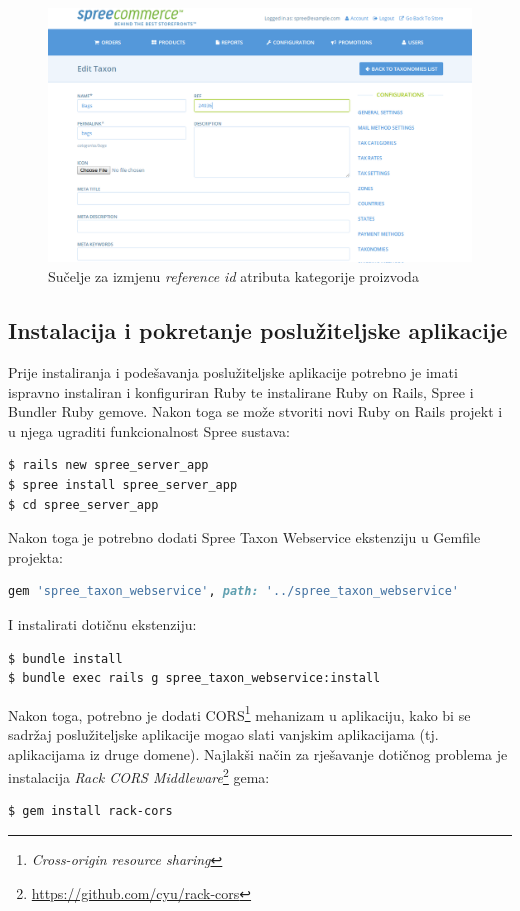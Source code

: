 \begin{figure}[H]
    \centering
    \includegraphics[scale=0.36]{pictures/spree_taxon_webservice}
    \caption{Sučelje za izmjenu \textit{reference id} atributa kategorije proizvoda}
\end{figure}

\subsection{Instalacija i pokretanje poslužiteljske aplikacije}

Prije instaliranja i podešavanja poslužiteljske aplikacije potrebno je imati ispravno instaliran i konfiguriran Ruby te instalirane Ruby on Rails, Spree i Bundler Ruby gemove. 
Nakon toga se može stvoriti novi Ruby on Rails projekt i u njega ugraditi funkcionalnost Spree sustava:
\begin{lstlisting}[language=bash]
$ rails new spree_server_app
$ spree install spree_server_app
$ cd spree_server_app
\end{lstlisting}

Nakon toga je potrebno dodati Spree Taxon Webservice ekstenziju u Gemfile projekta:
\begin{lstlisting}[language=ruby]
gem 'spree_taxon_webservice', path: '../spree_taxon_webservice'
\end{lstlisting}

I instalirati dotičnu ekstenziju:
\begin{lstlisting}[language=bash]
$ bundle install
$ bundle exec rails g spree_taxon_webservice:install
\end{lstlisting}

Nakon toga, potrebno je dodati CORS\footnote{\textit{Cross-origin resource sharing}} mehanizam u aplikaciju, kako bi se sadržaj poslužiteljske aplikacije mogao slati vanjskim aplikacijama (tj. aplikacijama iz druge domene). 
Najlakši način za rješavanje dotičnog problema je instalacija \textit{Rack CORS Middleware}\footnote{\url{https://github.com/cyu/rack-cors}} gema:
\begin{lstlisting}[language=bash]
$ gem install rack-cors
\end{lstlisting}

